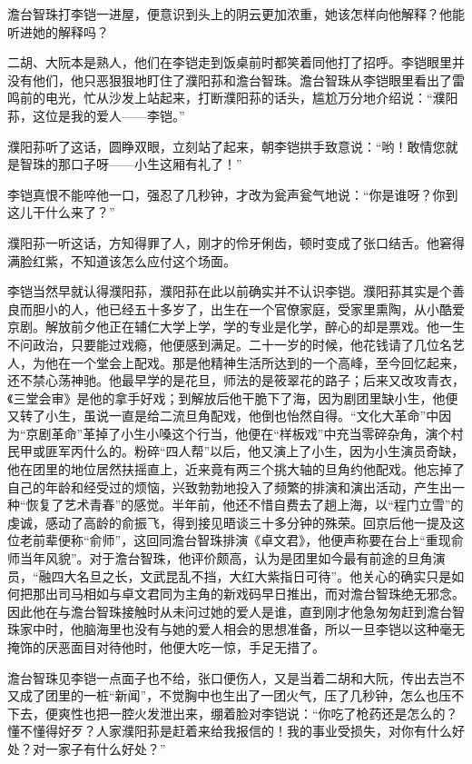 \par 澹台智珠打李铠一进屋，便意识到头上的阴云更加浓重，她该怎样向他解释？他能听进她的解释吗？
\par 二胡、大阮本是熟人，他们在李铠走到饭桌前时都笑着同他打了招呼。李铠眼里并没有他们，他只恶狠狠地盯住了濮阳荪和澹台智珠。澹台智珠从李铠眼里看出了雷鸣前的电光，忙从沙发上站起来，打断濮阳荪的话头，尴尬万分地介绍说：“濮阳荪，这位是我的爱人——李铠。”
\par 濮阳荪听了这话，圆睁双眼，立刻站了起来，朝李铠拱手致意说：“哟！敢情您就是智珠的那口子呀——小生这厢有礼了！”
\par 李铠真恨不能啐他一口，强忍了几秒钟，才改为瓮声瓮气地说：“你是谁呀？你到这儿干什么来了？”
\par 濮阳荪一听这话，方知得罪了人，刚才的伶牙俐齿，顿时变成了张口结舌。他窘得满脸红紫，不知道该怎么应付这个场面。
\par 李铠当然早就认得濮阳荪，濮阳荪在此以前确实并不认识李铠。濮阳荪其实是个善良而胆小的人，他已经五十多岁了，出生在一个官僚家庭，受家里熏陶，从小酷爱京剧。解放前夕他正在辅仁大学上学，学的专业是化学，醉心的却是票戏。他一生不问政治，只要能过戏瘾，他便感到满足。二十一岁的时候，他花钱请了几位名艺人，为他在一个堂会上配戏。那是他精神生活所达到的一个高峰，至今回忆起来，还不禁心荡神驰。他最早学的是花旦，师法的是筱翠花的路子；后来又改攻青衣，《三堂会审》是他的拿手好戏；到解放后他干脆下了海，因为剧团里缺小生，他便又转了小生，虽说一直是给二流旦角配戏，他倒也怡然自得。“文化大革命”中因为“京剧革命”革掉了小生小嗓这个行当，他便在“样板戏”中充当零碎杂角，演个村民甲或匪军丙什么的。粉碎“四人帮”以后，他又演上了小生，因为小生演员奇缺，他在团里的地位居然扶摇直上，近来竟有两三个挑大轴的旦角约他配戏。他忘掉了自己的年龄和经受过的烦恼，兴致勃勃地投入了频繁的排演和演出活动，产生出一种“恢复了艺术青春”的感觉。半年前，他还不惜自费去了趟上海，以“程门立雪”的虔诚，感动了高龄的俞振飞，得到接见晤谈三十多分钟的殊荣。回京后他一提及这位老前辈便称“俞师”，这回同澹台智珠排演《卓文君》，他便声称要在台上“重现俞师当年风貌”。对于澹台智珠，他评价颇高，认为是团里如今最有前途的旦角演员，“融四大名旦之长，文武昆乱不挡，大红大紫指日可待”。他关心的确实只是如何把那出司马相如与卓文君同为主角的新戏码早日推出，而对澹台智珠绝无邪念。因此他在与澹台智珠接触时从未问过她的爱人是谁，直到刚才他急匆匆赶到澹台智珠家中时，他脑海里也没有与她的爱人相会的思想准备，所以一旦李铠以这种毫无掩饰的厌恶面目对待他时，他便大吃一惊，手足无措了。
\par 澹台智珠见李铠一点面子也不给，张口便伤人，又是当着二胡和大阮，传出去岂不又成了团里的一桩“新闻”，不觉胸中也生出了一团火气，压了几秒钟，怎么也压不下去，便爽性也把一腔火发泄出来，绷着脸对李铠说：“你吃了枪药还是怎么的？懂不懂得好歹？人家濮阳荪是赶着来给我报信的！我的事业受损失，对你有什么好处？对一家子有什么好处？”
